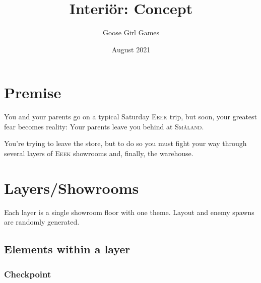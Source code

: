 \documentclass[a4paper]{article}
\theoremstyle{definition}
\theoremstyle{remark}
\begin{document}
\author{Goose Girl Games}
\date{August 2021}

\title{\textbf{%
    Interiör: Concept
}}

\maketitle

\tableofcontents

\newpage




\newcommand{\ikea}{\textsc{Eeek}\xspace}
\newcommand{\smaland}{\textsc{Småland}\xspace}

\section{Premise}

You and your parents go on a typical Saturday \ikea trip,
but soon, your greatest fear becomes reality:
Your parents leave you behind at \smaland.

You're trying to leave the store, but to do so you must fight your way
through several layers of \ikea showrooms and, finally, the warehouse.

\section{Layers/Showrooms}

Each layer is a single showroom floor with one theme.
Layout and enemy spawns are randomly generated.

\subsection{Elements within a layer}

\subsubsection{Checkpoint}
\end{document}
